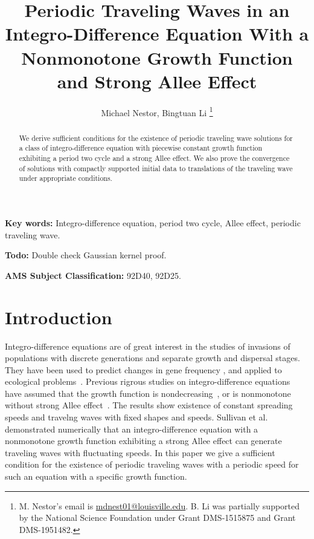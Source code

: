 \documentclass[11pt]{article}
\title{Periodic Traveling Waves in an Integro-Difference Equation With a Nonmonotone Growth Function and Strong Allee Effect}
\author{Michael Nestor, Bingtuan Li
\thanks{M. Nestor's email is \href{mailto:mdnest01@louisville.edu}{mdnest01@louisville.edu}. B. Li was partially supported by the National Science Foundation under Grant DMS-1515875 and Grant DMS-1951482.}}
\affil{Department of Mathematics, University of Louisville, \newline Louisville, KY 40292.}
\theoremstyle{definition}
\numberwithin{equation}{section}
\numberwithin{thm}{section}
\begin{document}
\maketitle


\begin{abstract}
We derive sufficient conditions for the existence of periodic traveling wave solutions for a class of integro-difference equation with piecewise constant growth function exhibiting a period two cycle and a strong Allee effect. We also prove the convergence of solutions with compactly supported initial data to translations of the traveling wave under appropriate conditions. 
\end{abstract}


{\bf Key words:} Integro-difference equation, period two cycle, Allee effect, periodic traveling wave.
\newline

{\bf Todo:} Double check Gaussian kernel proof.
\newline

{\bf AMS Subject Classification:} 92D40, 92D25.



\section{Introduction}

Integro-difference equations are of great interest in the studies of invasions of populations with discrete generations and separate growth and dispersal stages. They have been used to predict changes in gene frequency \cite{lui82a, lui82b, lui83, slatkin, w78}, and applied to ecological problems~\cite{hh, ks, kot89, kot92, kotbook, lut, nkl,otto}. Previous rigrous studies on integro-difference equations have assumed that the growth function is nondecreasing~\cite{w78, wein82}, or  is nonmonotone without strong Allee effect~\cite{lui83, wang}. The results show existence of constant spreading speeds and travelng waves with fixed shapes and speeds.   Sullivan et al. ~\cite{pnas} demonstrated numerically  that an integro-difference equation with a nonmonotone growth function exhibiting  a strong Allee effect can generate traveling waves with fluctuating speeds. In this paper we give a sufficient condition for the existence of periodic traveling waves with a periodic speed for such an equation with a specific growth function.
\end{document}
